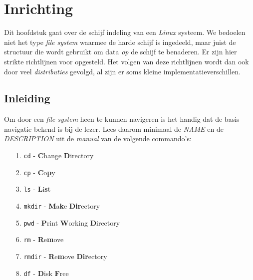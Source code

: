 %
%
%
%

\chapter{Inrichting}
Dit hoofdstuk gaat over de schijf indeling van een \emph{Linux} systeem. We bedoelen niet het type \emph{file system} waarmee de harde schijf is ingedeeld, maar juist de structuur die wordt gebruikt om data \emph{op} de schijf te benaderen. Er zijn hier strikte richtlijnen voor opgesteld. Het volgen van deze richtlijnen wordt dan ook door veel \emph{distributies} gevolgd, al zijn er soms kleine implementatieverschillen. 

\section{Inleiding}
Om door een \emph{file system} heen te kunnen navigeren is het handig dat de basis navigatie bekend is bij de lezer. Lees daarom minimaal de \emph{NAME} en de \emph{DESCRIPTION} uit de \emph{manual} van de volgende commando's:
\begin{itemize}
  \item[1.] \texttt{cd} - \textbf{C}hange \textbf{D}irectory
  \item[2.] \texttt{cp} - \textbf{C}o\textbf{p}y
  \item[3.] \texttt{ls} - \textbf{L}i\textbf{s}t
  \item[4.] \texttt{mkdir} - \textbf{M}a\textbf{k}e \textbf{Dir}ectory
  \item[5.] \texttt{pwd} - \textbf{P}rint \textbf{W}orking \textbf{D}irectory
  \item[6.] \texttt{rm} - \textbf{R}e\textbf{m}ove
  \item[7.] \texttt{rmdir} - \textbf{R}e\textbf{m}ove \textbf{Dir}ectory
  \item[8.] \texttt{df} - \textbf{D}isk \textbf{F}ree
\end{itemize}

